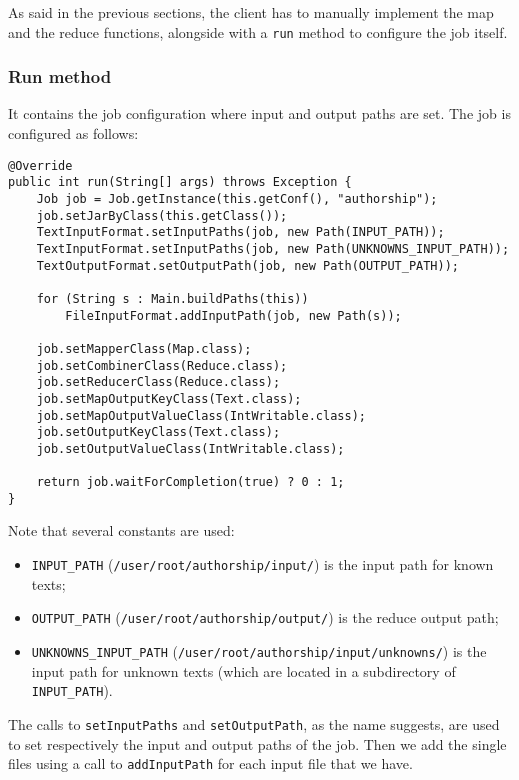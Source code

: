 \documentclass[a4paper,11pt, twoside]{article}
\begin{document}
		\bigskip
		\noindent
		As said in the previous sections, the client has to manually implement the map and the reduce functions, alongside with a \lstinline|run| method to configure the job itself.

	\subsubsection{Run method}
		It contains the job configuration where input and output paths are set.
		The job is configured as follows:
	
	\begin{lstlisting}[firstnumber=48, caption={Run method}, captionpos=b]
@Override
public int run(String[] args) throws Exception {
	Job job = Job.getInstance(this.getConf(), "authorship");
	job.setJarByClass(this.getClass());
	TextInputFormat.setInputPaths(job, new Path(INPUT_PATH));
	TextInputFormat.setInputPaths(job, new Path(UNKNOWNS_INPUT_PATH));
	TextOutputFormat.setOutputPath(job, new Path(OUTPUT_PATH));
	
	for (String s : Main.buildPaths(this))
		FileInputFormat.addInputPath(job, new Path(s));
	
	job.setMapperClass(Map.class);
	job.setCombinerClass(Reduce.class);
	job.setReducerClass(Reduce.class);
	job.setMapOutputKeyClass(Text.class);
	job.setMapOutputValueClass(IntWritable.class);
	job.setOutputKeyClass(Text.class);
	job.setOutputValueClass(IntWritable.class);
	
	return job.waitForCompletion(true) ? 0 : 1;
}
	\end{lstlisting}
	
		\noindent
		Note that several constants are used: \begin{itemize}
			\item \lstinline|INPUT_PATH| (\lstinline|/user/root/authorship/input/|) is the input path for known texts;
			\item \lstinline|OUTPUT_PATH| (\lstinline|/user/root/authorship/output/|) is the reduce output path;
			\item \lstinline|UNKNOWNS_INPUT_PATH| (\lstinline|/user/root/authorship/input/unknowns/|) is the input path for unknown texts (which are located in a subdirectory of \lstinline|INPUT_PATH|).
		\end{itemize}

		\noindent
		The calls to \lstinline|setInputPaths| and \lstinline|setOutputPath|, as the name suggests, are used to set respectively the input and output paths of the job. Then we add the single files using a call to \lstinline|addInputPath| for each input file that we have. 
		
\end{document}
